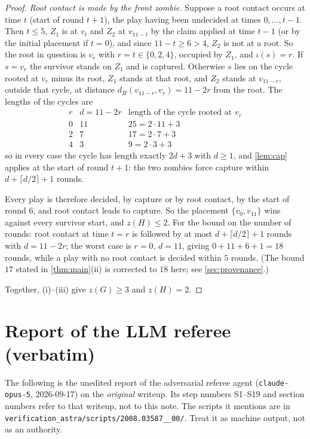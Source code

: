\documentclass[11pt,a4paper]{article}
\theoremstyle{plain}
\theoremstyle{definition}
\theoremstyle{remark}
\newcommand{\dist}{d}
\newcommand{\idx}{\iota}
\begin{document}
\begin{proof}
\emph{Root contact is made by the front zombie.} Suppose a root contact occurs at time $t$ (start of round $t+1$), the play having been undecided at times $0,\dots,t-1$. Then $t\le5$, $Z_1$ is at $v_t$ and $Z_2$ at $v_{11-t}$ by the claim applied at time $t-1$ (or by the initial placement if $t=0$), and since $11-t\ge6>4$, $Z_2$ is not at a root. So the root in question is $v_r$ with $r=t\in\{0,2,4\}$, occupied by $Z_1$, and $\idx(s)=r$. If $s=v_r$ the survivor stands on $Z_1$ and is captured. Otherwise $s$ lies on the cycle rooted at $v_r$ minus its root, $Z_1$ stands at that root, and $Z_2$ stands at $v_{11-r}$, outside that cycle, at distance $\dist_H(v_{11-r},v_r)=11-2r$ from the root. The lengths of the cycles are
\[
\begin{array}{c|c|c}
r & d=11-2r & \text{length of the cycle rooted at } v_r\\ \hline
0 & 11 & 25=2\cdot11+3\\
2 & 7 & 17=2\cdot7+3\\
4 & 3 & 9=2\cdot3+3
\end{array}
\]
so in every case the cycle has length exactly $2d+3$ with $d\ge1$, and \cref{lem:cap} applies at the start of round $t+1$: the two zombies force capture within $d+\lceil d/2\rceil+1$ rounds.

Every play is therefore decided, by capture or by root contact, by the start of round $6$, and root contact leads to capture. So the placement $\{v_0,v_{11}\}$ wins against every survivor start, and $z(H)\le2$. For the bound on the number of rounds: root contact at time $t=r$ is followed by at most $d+\lceil d/2\rceil+1$ rounds with $d=11-2r$; the worst case is $r=0$, $d=11$, giving $0+11+6+1=18$ rounds, while a play with no root contact is decided within $5$ rounds. (The bound $17$ stated in \cref{thm:main}(ii) is corrected to $18$ here; see \cref{sec:provenance}.)

Together, (i)--(iii) give $z(G)\ge3$ and $z(H)=2$.
\end{proof}

\section{Report of the LLM referee (verbatim)}\label{app:referee}

\begin{tcolorbox}[colback=gray!8,colframe=gray!50,boxrule=0.4pt,arc=2pt]
\small The following is the unedited report of the adversarial referee agent (\texttt{claude-opus-5}, 2026-09-17) on the \emph{original} writeup. Its step numbers S1--S19 and section numbers refer to that writeup, not to this note. The scripts it mentions are in \texttt{verification\_astra/scripts/2008.03587\_\_00/}. Treat it as machine output, not as an authority.
\end{tcolorbox}
\end{document}
